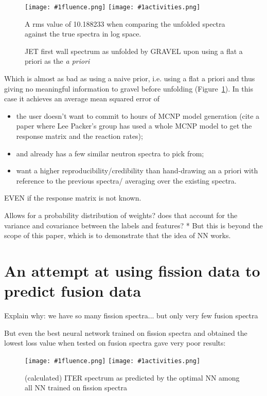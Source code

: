 \documentclass[a4paper, 12pt]{article}
\newcommand{\fluenceandactivities}[1]{
\texttt{[image: \#1fluence.png]}
\texttt{[image: \#1activities.png]}
}
\begin{document}
\begin{figure}
\centering
    \fluenceandactivities{/home/ocean/Documents/GitHubDir/unfolding/unfolding/unfoldingsuite/neuralnetwork/realinputEarlyStopping/comparison/real_fusion_test_gravel_test_001_}
    \caption{JET first wall spectrum as unfolded by GRAVEL upon using a flat a priori as the \emph{a priori}}\label{gravel_flat_a_priori_JET}
    A rms value of 10.188233 when comparing the unfolded spectra against the true spectra in log space.
\end{figure}
Which is almost as bad as using a naive prior, i.e. using a flat a priori and thus giving no meaningful information to gravel before unfolding (Figure~\ref{gravel_flat_a_priori_JET}). In this case it achieves an average mean squared error of 

\begin{itemize}
    \item the user doesn't want to commit to hours of MCNP model generation (cite a paper where Lee Packer's group has used a whole MCNP model to get the response matrix and the reaction rates);
    \item and already has a few similar neutron spectra to pick from;
    \item want a higher reproducibility/credibility than hand-drawing an a priori with reference to the previous spectra/ averaging over the existing spectra.
\end{itemize}

EVEN if the response matrix is not known.

Allows for a probability distribution of weights? does that account for the variance and covariance between the labels and features? *
But this is beyond the scope of this paper, which is to demonstrate that the idea of NN works.

\section{An attempt at using fission data to predict fusion data}
Explain why: we have so many fission spectra... but only very few fusion spectra

But even the best neural network trained on fission spectra and obtained the lowest loss value when tested on fusion spectra gave very poor results:
\begin{figure}
\centering
\fluenceandactivities{/home/ocean/Documents/GitHubDir/unfolding/unfolding/unfoldingsuite/neuralnetwork/realoutputEarlyStopping/SelectedNNreplicated/fission-fusion/0918_0325_5_layer_test_mse_1_test_007_}
\caption{(calculated) ITER spectrum as predicted by the optimal NN among all NN trained on fission spectra} \label{fission-fusionBad}
\end{figure}
\end{document}

